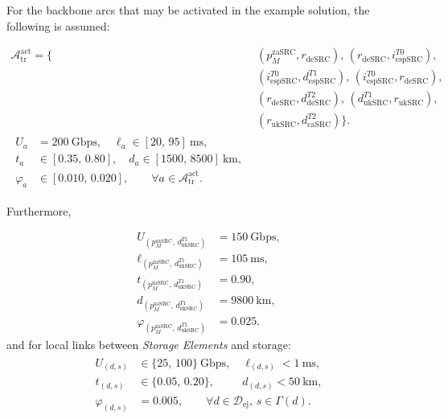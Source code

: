 \documentclass[a4paper,fleqn]{cas-dc}
\newcommand{\A}{\mathcal{A}}
\newcommand{\Dset}{\mathcal{D}}
\begin{document}
For the backbone arcs that may be activated in the example solution, the following is assumed:

\begin{align*}
\A_{\mathrm{tr}}^{\mathrm{act}} = \bigl\{ 
& (p_M^{\mathrm{zaSRC}},r_{\mathrm{deSRC}}),\,
  (r_{\mathrm{deSRC}},i_{\mathrm{espSRC}}^{T0}), \\
& (i_{\mathrm{espSRC}}^{T0},d_{\mathrm{espSRC}}^{T1}),\,
  (i_{\mathrm{espSRC}}^{T0},r_{\mathrm{deSRC}}), \\
& (r_{\mathrm{deSRC}},d_{\mathrm{deSRC}}^{T2}),\,
  (d_{\mathrm{ukSRC}}^{T1},r_{\mathrm{ukSRC}}), \\
& (r_{\mathrm{ukSRC}},d_{\mathrm{caSRC}}^{T2}) \bigr\}. \\[2ex]
\begin{split}
  U_a &= 200\ \text{Gbps}, \quad \ell_a \in [20,\, 95]\ \text{ms}, \\
  t_a &\in [0.35,\, 0.80], \quad d_a \in [1500,\, 8500]\ \text{km}, \\
  \varphi_a &\in [0.010,\, 0.020], \qquad \forall a \in \A_{\mathrm{tr}}^{\mathrm{act}}.
\end{split}
\end{align*}


Furthermore,

\begin{align*}
U_{(p_M^{\mathrm{zaSRC}},\, d_{\mathrm{ukSRC}}^{T1})} &= 150\ \text{Gbps}, \\[1ex]
\ell_{(p_M^{\mathrm{zaSRC}},\, d_{\mathrm{ukSRC}}^{T1})} &= 105\ \text{ms}, \\[1ex]
t_{(p_M^{\mathrm{zaSRC}},\, d_{\mathrm{ukSRC}}^{T1})} &= 0.90, \\[1ex]
d_{(p_M^{\mathrm{zaSRC}},\, d_{\mathrm{ukSRC}}^{T1})} &= 9800\ \text{km}, \\[1ex]
\varphi_{(p_M^{\mathrm{zaSRC}},\, d_{\mathrm{ukSRC}}^{T1})} &= 0.025.
\end{align*}
and for local links between \emph{Storage Elements} and storage:
\begin{align*}
\begin{split}
  U_{(d,s)} &\in \{25,\, 100\}\ \text{Gbps}, \quad \ell_{(d,s)} < 1\ \text{ms}, \\
  t_{(d,s)} &\in \{0.05,\, 0.20\}, \qquad\ \ d_{(d,s)} < 50\ \text{km}, \\
  \varphi_{(d,s)} &= 0.005, \qquad \forall d \in \Dset_{\mathrm{ej}}, \, s \in \Gamma(d).
\end{split}
\end{align*}
\end{document}
